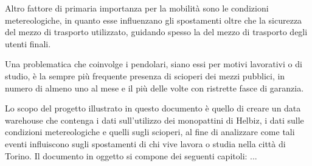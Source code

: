 Altro fattore di primaria importanza per la mobilità sono le condizioni metereologiche,
in quanto esse influenzano gli spostamenti oltre che la sicurezza del mezzo di
trasporto utilizzato, guidando spesso la del mezzo di trasporto degli utenti finali. 

Una problematica che coinvolge i pendolari, siano essi per motivi lavorativi o di
studio, è la sempre più frequente presenza di scioperi dei mezzi pubblici, in numero
di almeno uno al mese e il più delle volte con ristrette fasce di garanzia.

Lo scopo del progetto illustrato in questo documento è quello di creare un data
warehouse che contenga i dati sull'utilizzo dei monopattini di Helbiz, i dati sulle
condizioni metereologiche e quelli sugli scioperi, al fine di analizzare come tali
eventi influiscono sugli spostamenti di chi vive lavora o studia nella città di Torino.
Il documento in oggetto si compone dei seguenti capitoli:
...

